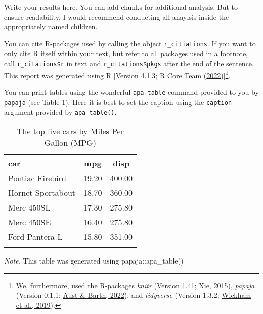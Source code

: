 \documentclass[
  man,floatsintext]{apa7}
\begin{document}
Write your results here. You can add chunks for additional analysis. But to ensure readability, I would recommend conducting all anaylsis inside the appropriately named children.

You can cite R-packages used by calling the object \texttt{r\_citiations}. If you want to only cite R itself within your text, but refer to all packages used in a footnote, call \texttt{r\_citations\$r} in text and \texttt{r\_citations\$pkgs} after the end of the sentence. This report was generated using R {[}Version 4.1.3; R Core Team (\protect\hyperlink{ref-R-base}{2022}){]}\footnote{We, furthermore, used the R-packages \emph{knitr} (Version 1.41; \protect\hyperlink{ref-R-knitr}{Xie, 2015}), \emph{papaja} (Version 0.1.1; \protect\hyperlink{ref-R-papaja}{Aust \& Barth, 2022}), and \emph{tidyverse} (Version 1.3.2; \protect\hyperlink{ref-R-tidyverse}{Wickham et al., 2019}).}.

You can print tables using the wonderful \texttt{apa\_table} command provided to you by \texttt{papaja} (see Table \ref{tab:results-example-table}). Here it is best to set the caption using the \texttt{caption} argument provided by \texttt{apa\_table()}.

\begin{table}[tbp]

\begin{center}
\begin{threeparttable}

\caption{\label{tab:results-example-table}The top five cars by Miles Per Gallon (MPG)}

\begin{tabular}{lll}
\toprule
car & \multicolumn{1}{c}{mpg} & \multicolumn{1}{c}{disp}\\
\midrule
Pontiac Firebird & 19.20 & 400.00\\
Hornet Sportabout & 18.70 & 360.00\\
Merc 450SL & 17.30 & 275.80\\
Merc 450SE & 16.40 & 275.80\\
Ford Pantera L & 15.80 & 351.00\\
\bottomrule
\addlinespace
\end{tabular}

\begin{tablenotes}[para]
\normalsize{\textit{Note.} This table was generated using papaja::apa\_table()}
\end{tablenotes}

\end{threeparttable}
\end{center}

\end{table}
\end{document}
